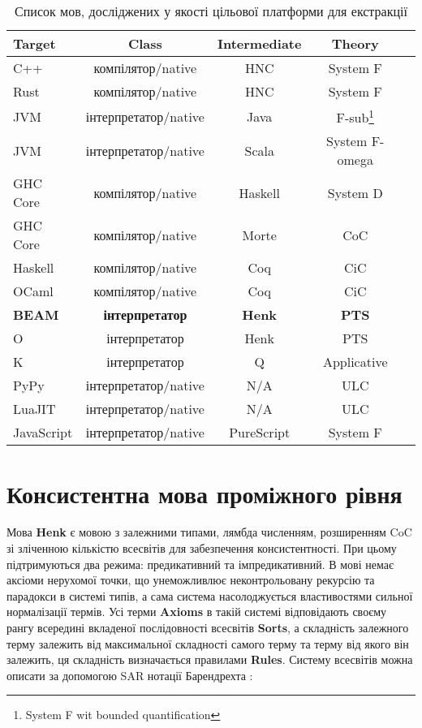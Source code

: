 \documentclass{article}
\begin{document}
\begin{table}[h]
\begin{center}
\caption{Список мов, досліджених у якості цільової платформи для екстракції}
\label{tab:a}
\begin{tabular}{lcccc}
\hline
{\bf Target} & {\bf Class} & {\bf Intermediate} & {\bf Theory}\\
\hline
C++        & компілятор/native      & HNC & System F\\
Rust       & компілятор/native      & HNC & System F\\
JVM        & інтерпретатор/native   & Java    & F-sub\footnote{System F wit bounded quantification}\\
JVM        & інтерпретатор/native   & Scala   & System F-omega\\
GHC Core   & компілятор/native      & Haskell & System D\\
GHC Core   & компілятор/native      & Morte   & CoC\\
Haskell    & компілятор/native      & Coq     & CiC\\
OCaml      & компілятор/native      & Coq     & CiC\\
{\bf BEAM} & {\bf інтерпретатор} & {\bf Henk}   & {\bf PTS} \\
O          & інтерпретатор          & Henk  & PTS \\
K          & інтерпретатор          & Q   & Applicative \\
PyPy       & інтерпретатор/native   & N/A & ULC \\
LuaJIT     & інтерпретатор/native   & N/A & ULC \\
JavaScript & інтерпретатор/native & PureScript & System F\\
\hline
\end{tabular}
\end{center}
\end{table}

\section{Консистентна мова проміжного рівня}
Мова \textbf{Henk} є мовою з залежними типами, лямбда численням, розширенням CoC зі зліченною кількістю всесвітів для забезпечення консистентності.
При цьому підтримуються два режима: предикативний та імпредикативний. В мові немає аксіоми нерухомої точки, що унеможливлює неконтрольовану рекурсію та парадокси в системі типів,
а сама система насолоджується властивостями сильної нормалізації термів.
Усі терми {\bf Axioms} в такій системі відповідають своєму рангу всередині вкладеної послідовності всесвітів {\bf Sorts},
а складність залежного терму залежить від максимальної складності самого терму та терму від якого він залежить, ця складність визначається
правилами {\bf Rules}. Систему всесвітів можна описати за допомогою SAR нотації Барендрехта \cite{Henk93}:
\end{document}
